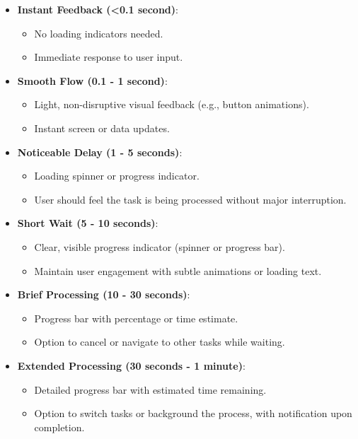 \documentclass{article}
\begin{document}
\begin{landscape}
\begin{itemize}
    \item \textbf{Instant Feedback (<0.1 second)}:
        \begin{itemize}
            \item No loading indicators needed.
            \item Immediate response to user input.
        \end{itemize}
    \item \textbf{Smooth Flow (0.1 - 1 second)}:
        \begin{itemize}
            \item Light, non-disruptive visual feedback (e.g., button animations).
            \item Instant screen or data updates.
        \end{itemize}
    \item \textbf{Noticeable Delay (1 - 5 seconds)}:
        \begin{itemize}
            \item Loading spinner or progress indicator.
            \item User should feel the task is being processed without major interruption.
        \end{itemize}
    \item \textbf{Short Wait (5 - 10 seconds)}:
        \begin{itemize}
            \item Clear, visible progress indicator (spinner or progress bar).
            \item Maintain user engagement with subtle animations or loading text.
        \end{itemize}
    \item \textbf{Brief Processing (10 - 30 seconds)}:
        \begin{itemize}
            \item Progress bar with percentage or time estimate.
            \item Option to cancel or navigate to other tasks while waiting.
        \end{itemize}
    \item \textbf{Extended Processing (30 seconds - 1 minute)}:
        \begin{itemize}
            \item Detailed progress bar with estimated time remaining.
            \item Option to switch tasks or background the process, with notification upon completion.

\end{itemize}
\end{itemize}
\end{landscape}
\end{document}
